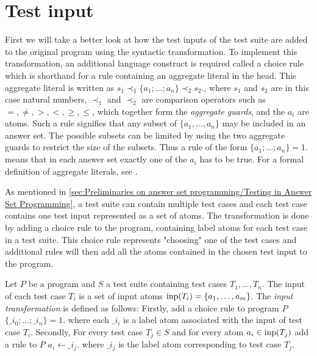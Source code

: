 \section{Test input}
\label{sec:Computing coverage metrics for propositional programs/Test input}
First we will take a better look at how the test inputs of the test suite are added to the original program using the syntactic transformation. To implement this transformation, an additional language construct is required called a choice rule which is shorthand for a rule containing an aggregate literal in the head. This aggregate literal is written as \(s_1 \prec_1 \{a_1; \ldots; a_n\} \prec_2 s_2.\), where $s_1$ and $s_2$ are in this case natural numbers, $\prec_1$ and $\prec_2$ are comparison operators such as $=, \neq, >, <, \geq, \leq$, which together form the \emph{aggregate guards}, and the $a_i$ are atoms. Such a rule signifies that any subset of $\{a_1, \ldots, a_n\}$ may be included in an answer set. The possible subsets can be limited by using the two aggregate guards to restrict the size of the subsets. Thus a rule of the form \(\{a_1; \ldots;a_n\} = 1.\) means that in each answer set exactly one of the $a_i$ has to be true. For a formal definition of aggregate literals, see \textcite{Geb+15}.

As mentioned in \cref{sec:Preliminaries on answer set programming/Testing in Answer Set Programming}, a test suite can contain multiple test cases and each test case contains one test input represented as a set of atoms. The transformation is done by adding a choice rule to the program, containing label atoms for each test case in a test suite. This choice rule represents "choosing" one of the test cases and additional rules will then add all the atoms contained in the chosen test input to the program.

\begin{definition}
\label{def:input transforamtion}
    Let $P$ be a program and $S$ a test suite containing test cases \(T_1, \ldots, T_n\). The input of each test case $T_i$ is a set of input atoms \(\operatorname{inp}(T_i) = \{a_1, \ldots,a_m\}\). The \emph{input transformation} is defined as follows:
    Firstly, add a choice rule to program $P$ \(\{\_i_0; \ldots;\_i_n\} = 1.\) where each $\_i_i$ is a label atom associated with the input of test case $T_i$. Secondly, For every test case \( T_j \in S\) and for every atom \( a_i \in \operatorname{inp}(T_j)\) add a rule to $P$ \(a_i \leftarrow \_i_j.\) where $\_i_j$ is the label atom corresponding to test case $T_j$.
\end{definition} 


